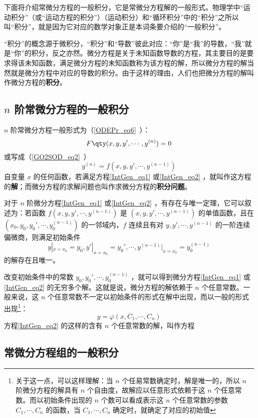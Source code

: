 下面将介绍常微分方程的一般积分，它是常微分方程解的一般形式。物理学中“运动积分”（或“运动方程的积分”）（运动积分）和“循环积分”中的“积分”之所以叫“积分”，就是因为它对应的数学对象正是本词条要介绍的“一般积分”。

“积分”的概念源于微积分，“积分”和“导数”彼此对应：“你”是“我”的导数，“我”就是“你”的积分，反之亦然。微分方程是关于未知函数导数的方程，其主要目的是要求得该未知函数，满足微分方程的未知函数称为该方程的解，所以微分方程的解当然就是微分方程中对应的导数的积分。由于这样的理由，人们也把微分方程的解叫作微分方程的\textbf{积分}。
\subsection{$n$ 阶常微分方程的一般积分}
$n$ 阶常微分方程一般形式为（\autoref{ODEPr_eq6}~）：
\begin{equation}\label{IntGen_eq1}
F \qty(x,y,y',\cdots,y^{(n)}) =0
\end{equation}
或写成（\autoref{GO2SOD_eq2}~）
\begin{equation}\label{IntGen_eq2}
y^{(n)}=f(x,y,y',\cdots,y^{(n-1)})
\end{equation}
自变量 $x$ 的任何函数，若满足方程\autoref{IntGen_eq1} 或\autoref{IntGen_eq2} ，就叫作这方程的\textbf{解}；而微分方程的求解问题也叫作求微分方程的\textbf{积分问题}。

对于 $n$ 阶微分方程\autoref{IntGen_eq1} 或\autoref{IntGen_eq2} ，有存在与唯一定理，它可以叙述为：若函数 $f(x,y,y',\cdots,y^{(n-1)})$ 是 $(x,y,y',\cdots,y^{(n-1)})$ 的单值函数，且在 $(x_0,y_0,y_0',\cdots,y_0^{(n-1)})$ 的一邻域内，$f$ 连续且有对 $y,y',\cdots,y^{(n-1)}$ 的一阶连续偏微商，则满足初始条件
\begin{equation}
y|_{x=x_0}=y_0,y'|_{x=x_0}=y_0',\cdots,y^{(n-1)}|_{x=x_0}=y_0^{(n-1)}
\end{equation}
的解存在且唯一。

改变初始条件中的常数 $y_0,y_0',\cdots,y_0^{(n-1)}$ ，就可以得到微分方程\autoref{IntGen_eq1} 或\autoref{IntGen_eq2} 的无穷多个解。这就是说，微分方程的解依赖于 $n$ 个任意常数。一般来说，这 $n$ 个任意常数不一定以初始条件的形式在解中出现，而以一般的形式出现\footnote{关于这一点，可以这样理解：当 $n$ 个任易常数确定时，解是唯一的，所以 $n$ 阶微分方程的解具有 $n$ 个自由度，故解应以任意形式依赖于这 $n$ 个任意常数。而以初始条件出现的 $n$ 个数可以看成表示这 $n$ 个任意常数的参数 $C_1,\cdots,C_n$ 的函数，当 $C_1,\cdots,C_n$ 确定时，就确定了对应的初始值}：
\begin{equation}
y=\varphi(x,C_1,\cdots,C_n)
\end{equation}
方程\autoref{IntGen_eq2} 的这样的含有 $n$ 个任意常数的解，叫作方程
\subsection{常微分方程组的一般积分}

